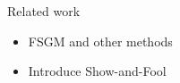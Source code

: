 Related work
\begin{itemize}
    \item FSGM and other methods
    \item Introduce Show-and-Fool
\end{itemize}